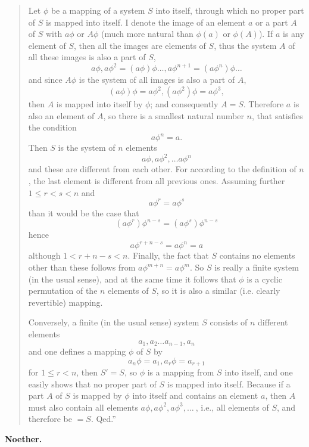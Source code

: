 \documentclass[leqno,hidelinks,10pt]{article}
\theoremstyle{definition}
\begin{document}
\begin{paracol}{2}
\begin{rightcolumn}
\begin{quote}
\hspace{12pt} Let $\phi$ be a mapping of a system $S$ into itself, through which
no proper part of $S$ is mapped into itself. I denote the image of an element $a$
or a part $A$ of $S$ with $a\phi$ or $A\phi$ (much more natural than $\phi(a)$
or $\phi(A)$). If $a$ is any element of $S$, then all the images are elements of
$S$, thus the system $A$ of all these images is also a part of $S$,
\vspace{16pt}
\[
	a\phi, a\phi^2= (a\phi)\phi \ldots, a\phi^{n+1} = (a\phi^n)\phi \ldots
\]
and since $A\phi$ is the system of all images is also a part of $A$,
\[
	(a\phi) \phi = a\phi^2, (a\phi^2)\phi = a\phi^3,
\]
then $A$ is mapped into itself by $\phi$; and consequently $A = S$. Therefore $a$
is also an element of $A$, so there is a smallest natural number $n$, that
satisfies the condition
\[
	a\phi^n = a.
\]
Then $S$ is the system of $n$ elements
\[
	a\phi,a\phi^2,\ldots a\phi^n
\]
and these are different from each other.
For according to the definition of $n$, the last element is different from all
previous ones. Assuming further $1 \leq r<s < n$ and
\[
	a\phi^r = a\phi^s
\]
than it would be the case that
\[
	(a\phi^r)\phi^{n-s} = (a\phi^s) \phi^{n-s}
\]
hence
\[
	a\phi^{r+n-s} = a\phi^n=a
\]
although $1<r+n-s<n$.
Finally, the fact that $S$ contains no elements other than these follows from
$a\phi^{m + n} = a\phi^m$. So $S$ is really a finite system (in the usual sense),
and at the same time it follows that $\phi$ is a cyclic permutation of the $n$
elements of $S$, so it is also a similar (i.e. clearly revertible) mapping.

\hspace{12pt} Conversely, a finite (in the usual sense) system $S$ consists of
$n$ different elements
\[
	a_1, a_2 \ldots a_{n-1}, a_n
\]
and one defines a mapping $\phi$ of $S$ by
\[
a_n\phi = a_1, a_r\phi=a_{r+1}
\]
for $1\leq r<n$, then $S' = S$, so $\phi$ is a mapping from $S$ into itself, and
one easily shows that no proper part of $S$ is mapped into itself. Because if
a part $A$ of $S$ is mapped by $\phi$ into itself and contains an element $a$,
then $A$ must also contain all elements $a\phi, a\phi^2, a\phi^3, \ldots \ $, i.e.,
all elements of $S$, and therefore be $= S$. Qed.''
\end{quote}
\begin{flushright}\textbf{Noether.}\end{flushright}

\end{rightcolumn}
\end{paracol}
\end{document}
